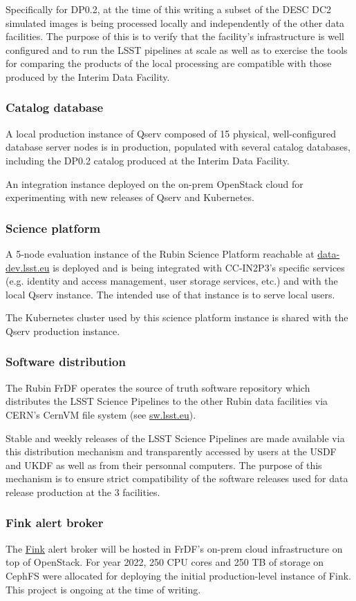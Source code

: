 Specifically for DP0.2, at the time of this writing a subset of the DESC DC2 simulated
images is being processed locally and independently of the other data facilities. The purpose of
this is to verify that the facility's infrastructure is well configured and to run the LSST pipelines
at scale as well as to exercise the tools for comparing the products of the local processing are
compatible with those produced by the Interim Data Facility.

\subsubsection{Catalog database}

A local production instance of Qserv composed of 15 physical, well-configured database server nodes 
is in production, populated with several catalog databases, including the DP0.2 catalog produced
at the Interim Data Facility.

An integration instance deployed on the on-prem OpenStack cloud for experimenting with new
releases of Qserv and Kubernetes.

\subsubsection{Science platform}

A 5-node evaluation instance of the Rubin Science Platform reachable at 
\href{https://data-dev.lsst.eu}{data-dev.lsst.eu} is deployed and is being integrated with
CC-IN2P3's specific services (e.g. identity and access management, user storage services, etc.) and
with the local Qserv instance. The intended use of that instance is to serve local users.

The Kubernetes cluster used by this science platform instance is shared with the Qserv production
instance.

\subsubsection{Software distribution}

The Rubin FrDF operates the source of truth software repository which distributes the LSST Science
Pipelines to the other Rubin data facilities via CERN's CernVM file system
(see \href{https://sw.lsst.eu}{sw.lsst.eu}).

Stable and weekly releases of the LSST Science Pipelines are made available via this distribution
mechanism and transparently accessed by users at the USDF and UKDF as well as from their
personnal computers. The purpose of this mechanism is to ensure strict compatibility of the software
releases used for data release production at the 3 facilities.


\subsubsection{Fink alert broker}

The \href{https://fink-broker.org}{Fink} alert broker will be hosted in FrDF's on-prem cloud
infrastructure on top of OpenStack. For year 2022, 250 CPU cores and 250 TB of storage on CephFS were
allocated for deploying the initial production-level instance of Fink. This project is ongoing at the
time of writing.